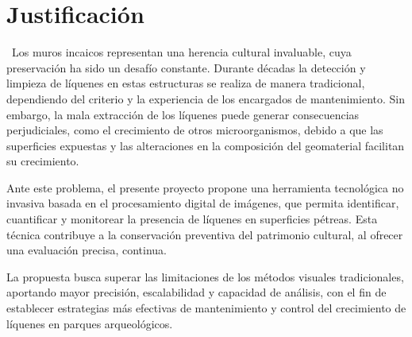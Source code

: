 \chapter{Justificación}\
Los muros incaicos representan una herencia cultural  invaluable, cuya preservación ha sido un desafío constante. Durante décadas  la detección y limpieza de líquenes en estas estructuras se realiza de manera tradicional, dependiendo del criterio y la experiencia de los encargados de mantenimiento. Sin embargo, la  mala extracción  de los líquenes puede generar consecuencias perjudiciales, como el crecimiento de otros microorganismos, debido a que las superficies expuestas y las alteraciones en la composición del geomaterial facilitan su crecimiento.

Ante este problema, el presente proyecto propone una herramienta tecnológica no invasiva basada en el procesamiento digital de imágenes, que permita identificar, cuantificar y monitorear la presencia de líquenes en superficies pétreas. Esta técnica contribuye a la conservación preventiva del patrimonio cultural, al ofrecer una evaluación precisa, continua.

La propuesta busca superar las limitaciones de los métodos visuales tradicionales, aportando mayor precisión, escalabilidad y capacidad de análisis, con el fin de establecer estrategias más efectivas de mantenimiento y control del crecimiento de líquenes en parques arqueológicos.

